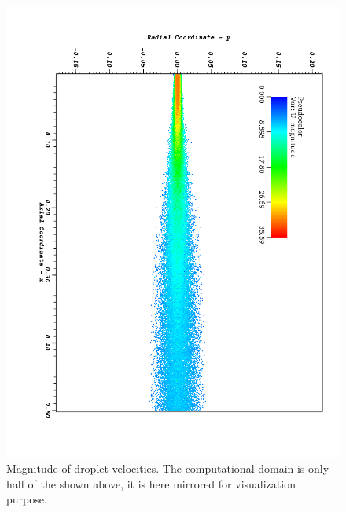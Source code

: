 \clearpage
\begin{figure}
 \centering
 \includegraphics[height=0.9\textheight]{./figuras/appA2/visit_U.png}
 \caption{Magnitude of droplet velocities. The computational domain is only half of the shown above, it is here mirrored for visualization purpose.}
 \label{fig: dropU}
\end{figure}

